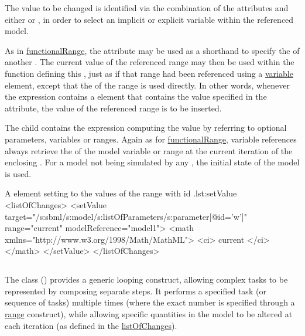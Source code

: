 The value to be changed is identified via the combination of the attributes  and either  or , in order to select an implicit or explicit variable within the referenced model.

As in \hyperref[class:functionalRange]{functionalRange}, the attribute  may be used as a shorthand to specify the  of another . The current value of the referenced range may then be used within the function defining this , just as if that range had been referenced using a \hyperref[class:variable]{variable} element, except that the  of the range is used directly. In other words, whenever the expression contains a  element that contains the value specified in the  attribute, the value of the referenced range is to be inserted.

The child  contains the expression computing the value by referring to optional parameters, variables or ranges.
Again as for \hyperref[class:functionalRange]{functionalRange}, variable references always retrieve the  of the model variable or range at the current iteration of the enclosing . For a model not being simulated by any , the initial state of the model is used.

\begin{myXmlLst}{A  element setting  to the values of the range with id .}{lst:setValue}
<listOfChanges>
	<setValue target="/s:sbml/s:model/s:listOfParameters/s:parameter[@id='w']"
		range="current" modelReference="model1">
		<math xmlns="http://www.w3.org/1998/Math/MathML">
			<ci> current </ci>
		</math>
	</setValue>
</listOfChanges>
\end{myXmlLst}


\subsection{}
\label{class:repeatedTask}
The  class () provides a generic looping construct, allowing complex tasks to be represented by composing separate steps. It performs a specified task (or sequence of tasks) multiple times (where the exact number is specified through a \hyperref[sec:ranges]{range} construct), while allowing specific quantities in the model to be altered at each iteration (as defined in the \hyperref[sec:changes]{listOfChanges}).


